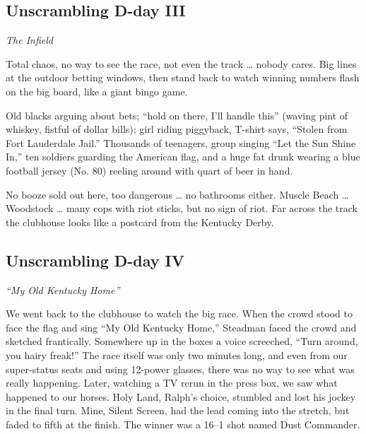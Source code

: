 \documentclass[9pt,a4paper]{extarticle}
\begin{document}
%
%

\subsection{Unscrambling D-day III}
\emph{The Infield}

Total chaos, no way to see the race, not even the track … nobody cares. Big lines at the outdoor betting windows, then stand back to watch winning numbers flash on the big board, like a giant bingo game.

Old blacks arguing about bets; “hold on there, I’ll handle this” (waving pint of whiskey, fistful of dollar bills); girl riding piggyback, T-shirt says, “Stolen from Fort Lauderdale Jail.” Thousands of teenagers, group singing “Let the Sun Shine In,” ten soldiers guarding the American flag, and a huge fat drunk wearing a blue football jersey (No. 80) reeling around with quart of beer in hand.

No booze sold out here, too dangerous … no bathrooms either. Muscle Beach … Woodstock … many cops with riot sticks, but no sign of riot. Far across the track the clubhouse looks like a postcard from the Kentucky Derby.

\subsection{Unscrambling D-day IV}
\emph{“My Old Kentucky Home”}

We went back to the clubhouse to watch the big race. When the crowd stood to face the flag and sing “My Old Kentucky Home,” Steadman faced the crowd and sketched frantically. Somewhere up in the boxes a voice screeched, “Turn around, you hairy freak!” The race itself was only two minutes long, and even from our super-status seats and using 12-power glasses, there was no way to see what was really happening. Later, watching a TV rerun in the press box, we saw what happened to our horses. Holy Land, Ralph’s choice, stumbled and lost his jockey in the final turn. Mine, Silent Screen, had the lead coming into the stretch, but faded to fifth at the finish. The winner was a 16–1 shot named Dust Commander.
\end{document}
